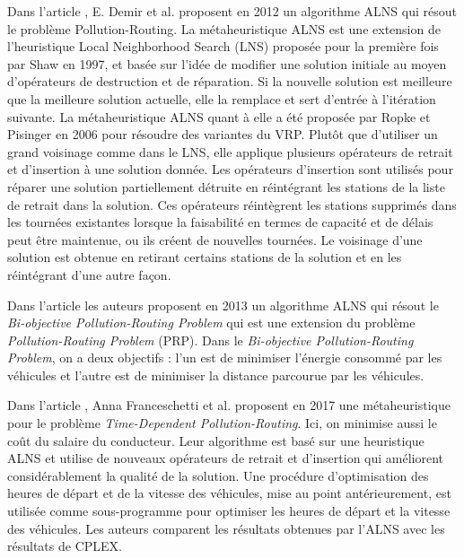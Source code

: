 Dans l'article \cite{article_GVRP7}, E. Demir et al. proposent en 2012 un algorithme ALNS qui résout le problème Pollution-Routing. La métaheuristique ALNS est une extension de l'heuristique Local Neighborhood Search (LNS) proposée pour la première fois par Shaw \cite{article_Shaw} en 1997, et basée sur l'idée de modifier une solution initiale au moyen d'opérateurs de destruction et de réparation. Si la nouvelle solution est meilleure que la meilleure solution actuelle, elle la remplace et sert d'entrée à l'itération suivante. La métaheuristique ALNS quant à elle a été proposée par Ropke et Pisinger \cite{article_Ropke} en 2006 pour résoudre des variantes du VRP. Plutôt que d'utiliser un grand voisinage comme dans le LNS, elle applique plusieurs opérateurs de retrait et d'insertion à une solution donnée. Les opérateurs d'insertion sont utilisés pour réparer une solution partiellement détruite en réintégrant les stations de la liste de retrait dans la solution. Ces opérateurs réintègrent les stations supprimés dans les tournées existantes lorsque la faisabilité en termes de capacité et de délais peut être maintenue, ou ils créent de nouvelles tournées. Le voisinage d'une solution est obtenue en retirant certains stations de la solution et en les réintégrant d'une autre façon.


Dans l'article \cite{article_GVRP6} les auteurs proposent en 2013 un algorithme ALNS qui résout le \textit{Bi-objective Pollution-Routing Problem} qui est une extension du problème \textit{Pollution-Routing Problem} (PRP). Dans le \textit{Bi-objective Pollution-Routing Problem}, on a deux objectifs : l'un est de minimiser l'énergie consommé par les véhicules et l'autre est de minimiser la distance parcourue par les véhicules.


Dans l'article \cite{article_GVRP8}, Anna Franceschetti et al. proposent en 2017 une métaheuristique pour le problème \textit{Time-Dependent Pollution-Routing}. Ici, on minimise aussi le coût du salaire du conducteur.
Leur algorithme est basé sur une heuristique ALNS et utilise de nouveaux opérateurs de retrait et d'insertion qui améliorent considérablement la qualité de la solution. Une procédure d'optimisation des heures de départ et de la vitesse des véhicules, mise au point antérieurement, est utilisée comme sous-programme pour optimiser les heures de départ et la vitesse des véhicules. Les auteurs comparent les résultats obtenues par l'ALNS avec les résultats de CPLEX.

